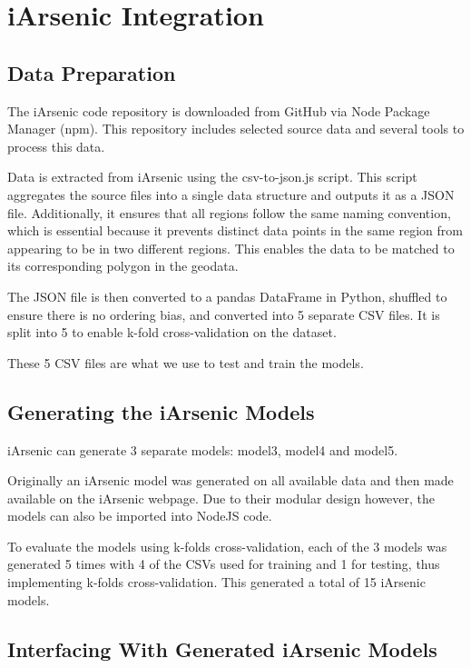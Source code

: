 \section{iArsenic Integration}

\subsection{Data Preparation}

The iArsenic code repository is downloaded from GitHub via Node Package Manager (npm). This repository includes selected source data and several tools to process this data.

Data is extracted from iArsenic using the csv-to-json.js script. This script aggregates the source files into a single data structure and outputs it as a JSON file. Additionally, it ensures that all regions follow the same naming convention, which is essential because it prevents distinct data points in the same region from appearing to be in two different regions. This enables the data to be matched to its corresponding polygon in the geodata.

The JSON file is then converted to a pandas DataFrame in Python, shuffled to ensure there is no ordering bias, and converted into 5 separate CSV files. It is split into 5 to enable k-fold cross-validation on the dataset.

These 5 CSV files are what we use to test and train the models.

\subsection{Generating the iArsenic Models}

iArsenic can generate 3 separate models: model3, model4 and model5.

Originally an iArsenic model was generated on all available data and then made available on the iArsenic webpage. Due to their modular design however, the models can also be imported into NodeJS code.

To evaluate the models using k-folds cross-validation, each of the 3 models was generated 5 times with 4 of the CSVs used for training and 1 for testing, thus implementing k-folds cross-validation. This generated a total of 15 iArsenic models.

\subsection{Interfacing With Generated iArsenic Models}


